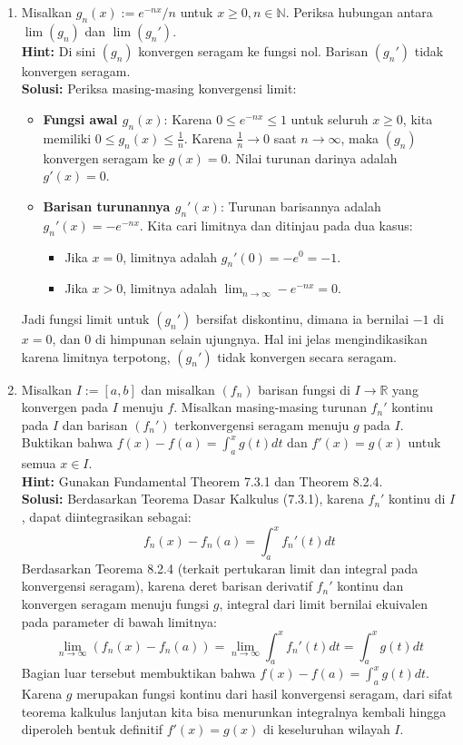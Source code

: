 ﻿\documentclass{article}
\begin{document}
\begin{enumerate}
        \vspace{0.5cm}
  \item[10.] Misalkan $g_n(x) := e^{-nx} / n$ untuk $x \ge 0, n \in \mathbb{N}$. Periksa hubungan antara $\lim (g_n)$ dan $\lim (g_n')$.\\
        \textbf{Hint:} Di sini $(g_n)$ konvergen seragam ke fungsi nol. Barisan $(g_n')$ tidak konvergen seragam.\\
        \textbf{Solusi:}
        Periksa masing-masing konvergensi limit:
        \begin{itemize}
          \item \textbf{Fungsi awal $g_n(x)$}: Karena $0 \le e^{-nx} \le 1$ untuk seluruh $x \ge 0$, kita memiliki $0 \le g_n(x) \le \frac{1}{n}$. Karena $\frac{1}{n} \to 0$ saat $n \to \infty$, maka $(g_n)$ konvergen seragam ke $g(x) = 0$. Nilai turunan darinya adalah $g'(x) = 0$.
          \item \textbf{Barisan turunannya $g_n'(x)$}: Turunan barisannya adalah $g_n'(x) = -e^{-nx}$. Kita cari limitnya dan ditinjau pada dua kasus:
                \begin{itemize}
                  \item Jika $x = 0$, limitnya adalah $g_n'(0) = -e^{0} = -1$.
                  \item Jika $x > 0$, limitnya adalah $\lim_{n \to \infty} -e^{-nx} = 0$.
                \end{itemize}
        \end{itemize}
        Jadi fungsi limit untuk $(g_n')$ bersifat diskontinu, dimana ia bernilai $-1$ di $x=0$, dan $0$ di himpunan selain ujungnya. Hal ini jelas mengindikasikan karena limitnya terpotong, $(g_n')$ tidak konvergen secara seragam.

        \vspace{0.5cm}
  \item[11.] Misalkan $I := [a, b]$ dan misalkan $(f_n)$ barisan fungsi di $I \to \mathbb{R}$ yang konvergen pada $I$ menuju $f$. Misalkan masing-masing turunan $f_n'$ kontinu pada $I$ dan barisan $(f_n')$ terkonvergensi seragam menuju $g$ pada $I$. Buktikan bahwa $f(x) - f(a) = \int_a^x g(t)dt$ dan $f'(x) = g(x)$ untuk semua $x \in I$.\\
        \textbf{Hint:} Gunakan Fundamental Theorem 7.3.1 dan Theorem 8.2.4.\\
        \textbf{Solusi:}
        Berdasarkan Teorema Dasar Kalkulus (7.3.1), karena $f_n'$ kontinu di $I$, dapat diintegrasikan sebagai:
        \[ f_n(x) - f_n(a) = \int_a^x f_n'(t) dt \]
        Berdasarkan Teorema 8.2.4 (terkait pertukaran limit dan integral pada konvergensi seragam), karena deret barisan derivatif $f_n'$ kontinu dan konvergen seragam menuju fungsi $g$, integral dari limit bernilai ekuivalen pada parameter di bawah limitnya:
        \[ \lim_{n \to \infty} (f_n(x) - f_n(a)) = \lim_{n \to \infty} \int_a^x f_n'(t) dt = \int_a^x g(t) dt \]
        Bagian luar tersebut membuktikan bahwa $f(x) - f(a) = \int_a^x g(t) dt$.
        Karena $g$ merupakan fungsi kontinu dari hasil konvergensi seragam, dari sifat teorema kalkulus lanjutan kita bisa menurunkan integralnya kembali hingga diperoleh bentuk definitif $f'(x) = g(x)$ di keseluruhan wilayah $I$.


\end{enumerate}
\end{document}
